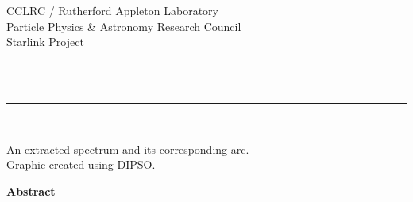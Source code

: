 \thispagestyle{empty}

\begin{latexonly}
   CCLRC / {\sc Rutherford Appleton Laboratory} \hfill {\bf \stardocname}\\
   {\large Particle Physics \& Astronomy Research Council}\\
   {\large Starlink Project\\}
   {\large \stardoccategory\ \stardocnumber}
   \begin{flushright}
   \stardocauthors\\
   \stardocdate
   \end{flushright}
   \vspace{-4mm}
   \rule{\textwidth}{0.5mm}
   \vspace{5mm}
   \begin{center}
   {\Huge\bf  \stardoctitle \\ [2.5ex]}
   \end{center}
   \vspace{-5mm}

   \begin{center}
   \leavevmode\epsfysize=100mm

   An extracted spectrum and its corresponding arc.\\
   Graphic created using DIPSO\cite{dipso}\@.
   \end{center}

   \vspace{10mm}
   \begin{center}
      {\Large\bf Abstract}
   \end{center}
\end{latexonly}

